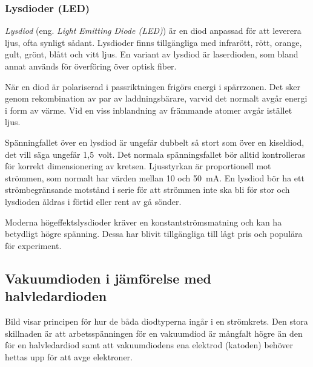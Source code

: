 \newpage
\subsubsection{Lysdioder (LED)}
\label{diod_led}

\emph{Lysdiod} (eng. \emph{Light Emitting Diode (LED)}) är en diod anpassad för
att leverera ljus, ofta synligt sådant.
Lysdioder finns tillgängliga med infrarött, rött, orange, gult, grönt,
blått och vitt ljus.
En variant av lysdiod är laserdioden, som bland annat används för överföring
över optisk fiber.

När en diod är polariserad i passriktningen frigörs energi i spärrzonen.
Det sker genom rekombination av par av laddningsbärare, varvid det normalt avgår
energi i form av värme.
Vid en viss inblandning av främmande atomer avgår istället ljus.

Spänningfallet över en lysdiod är ungefär dubbelt så stort som över en
kiseldiod, det vill säga ungefär 1,5~volt.
Det normala spänningsfallet bör alltid kontrolleras för korrekt dimensionering
av kretsen.
Ljusstyrkan är proportionell mot strömmen, som normalt har värden mellan 10 och
\qty{50}{\milli\ampere}.
En lysdiod bör ha ett strömbegränsande motstånd i serie för att strömmen
inte ska bli för stor och lysdioden åldras i förtid eller rent av gå sönder.

Moderna högeffektslysdioder kräver en konstant\-strömsmatning och kan ha betydligt
högre spänning.
Dessa har blivit tillgängliga till lågt pris och populära för experiment.

\subsection{Vakuumdioden i jämförelse med halvledardioden}


Bild  visar principen för hur de båda diodtyperna ingår i
en strömkrets.
Den stora skillnaden är att arbetsspänningen för en vakuumdiod är mångfalt
högre än den för en halvledardiod samt att vakuumdiodens ena elektrod (katoden)
behöver hettas upp för att avge elektroner.
